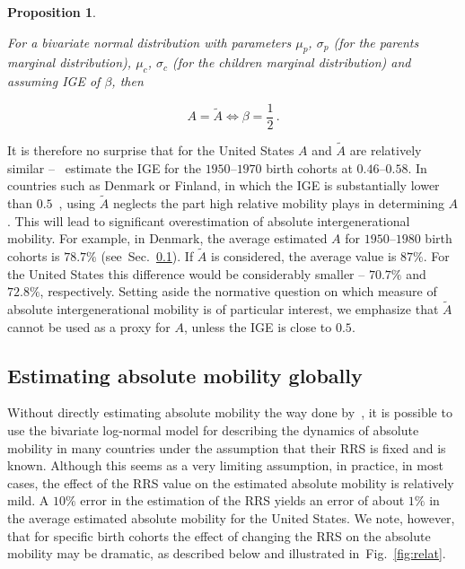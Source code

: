 \documentclass[12pt,a4paper]{article}
\newtheorem{proposition}{Proposition}
\newcommand{\sref}[1]{Sec.~\ref{sec:#1}}
\newcommand{\fref}[1]{Fig.~\ref{fig:#1}}
\newcommand{\be}{\begin{equation}}
\newcommand{\ee}{\end{equation}}
\numberwithin{equation}{section}
\begin{document}
\begin{proposition}
\label{prop:prop3}

For a bivariate normal distribution with parameters $\mu_p$, $\sigma_p$ (for the parents marginal distribution), $\mu_c$, $\sigma_c$ (for the children marginal distribution) and assuming IGE of $\beta$, then

\be
A=\tilde{A} \iff \beta=\frac{1}{2}\,.
\ee
\end{proposition}

It is therefore no surprise that for the United States $A$ and $\tilde{A}$ are relatively similar --~\citet{aaronson2008intergenerational} estimate the IGE for the $1950$--$1970$ birth cohorts at $0.46$--$0.58$. In countries such as Denmark or Finland, in which the IGE is substantially lower than $0.5$~\citep{corak2013income}, using $\tilde{A}$ neglects the part high relative mobility plays in determining $A$. This will lead to significant overestimation of absolute intergenerational mobility. For example, in Denmark, the average estimated $A$ for $1950$--$1980$ birth cohorts is $78.7\%$ (see~\sref{global}). If $\tilde{A}$ is considered, the average value is $87\%$. For the United States this difference would be considerably smaller -- $70.7\%$ and $72.8\%$, respectively. Setting aside the normative question on which measure of absolute intergenerational mobility is of particular interest, we emphasize that $\tilde{A}$ cannot be used as a proxy for $A$, unless the IGE is close to $0.5$.

\subsection{Estimating absolute mobility globally}
\label{sec:global}

Without directly estimating absolute mobility the way done by~\citet{chetty2017fading}, it is possible to use the bivariate log-normal model for describing the dynamics of absolute mobility in many countries under the assumption that their RRS is fixed and is known. Although this seems as a very limiting assumption, in practice, in most cases, the effect of the RRS value on the estimated absolute mobility is relatively mild. A $10\%$ error in the estimation of the RRS yields an error of about $1\%$ in the average estimated absolute mobility for the United States. We note, however, that for specific birth cohorts the effect of changing the RRS on the absolute mobility may be dramatic, as described below and illustrated in~\fref{relat}.
\end{document}

